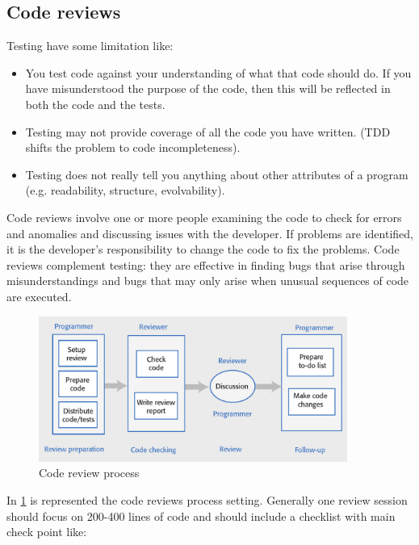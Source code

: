 \documentclass[10pt,a4paper]{report}
\begin{document}
\subsection{Code reviews}
Testing have some limitation like:
\begin{itemize}
	\item You test code against your understanding of what that code
	should do. If you have misunderstood the purpose of the code,
	then this will be reflected in both the code and the tests.
	\item Testing may not provide coverage of all the code you have
	written. (TDD shifts the problem to code incompleteness).
	\item Testing does not really tell you anything about other attributes
	of a program (e.g. readability, structure, evolvability).
\end{itemize}
Code reviews involve one or more people examining the code to check
for errors and anomalies and discussing issues with the developer.
If problems are identified, it is the developer’s responsibility to change
the code to fix the problems.
Code reviews complement testing: they are effective in finding bugs that
arise through misunderstandings and bugs that may only arise when
unusual sequences of code are executed.
\begin{figure}[h]
	\centering
	\includegraphics[width=0.9\textwidth]{image109}
	\caption{Code review process}
	\label{image109}
\end{figure} 
In \ref{image109} is represented the code reviews process setting. Generally one review session should focus on 200-400 lines of code and should include a checklist with main check point like:
\end{document}
